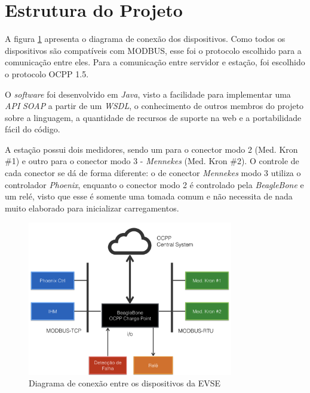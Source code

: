  \section{Estrutura do Projeto}
  \label{methodology:structure}

    A figura \ref{fig:proj-diagram} apresenta o diagrama de conexão dos dispositivos. Como todos os dispositivos são compatíveis com MODBUS, esse foi o protocolo escolhido para a comunicação entre eles. Para a comunicação entre servidor e estação, foi escolhido o protocolo \ac{OCPP} 1.5. 

    O \textit{software} foi desenvolvido em \textit{Java}, visto a facilidade para implementar uma \textit{API} \textit{\ac{SOAP}} a partir de um \textit{\ac{WSDL}}, o conhecimento de outros membros do projeto sobre a linguagem, a quantidade de recursos de suporte na web e a portabilidade fácil do código.

    A estação possui dois medidores, sendo um para o conector modo 2 (Med. Kron \#1) e outro para o conector modo 3 - \textit{Mennekes} (Med. Kron \#2). O controle de cada conector se dá de forma diferente: o de conector \textit{Mennekes} modo 3 utiliza o controlador \textit{Phoenix}, enquanto o conector modo 2 é controlado pela \textit{BeagleBone} e um relé, visto que esse é somente uma tomada comum e não necessita de nada muito elaborado para inicializar carregamentos.

    \begin{figure}[H]
      \begin{center}
        \includegraphics[width=0.8\textwidth,natwidth=400,natheight=288]{assets/images/devices-diagram.png}
        \caption{Diagrama de conexão entre os dispositivos da EVSE}
        \label{fig:proj-diagram}
      \end{center}
    \end{figure}

